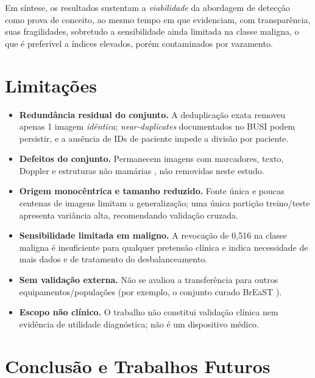\documentclass[11pt,a4paper]{article}
\begin{document}
Em síntese, os resultados sustentam a \emph{viabilidade} da abordagem de detecção
como prova de conceito, ao mesmo tempo em que evidenciam, com transparência, suas
fragilidades, sobretudo a sensibilidade ainda limitada na classe maligna, o
que é preferível a índices elevados, porém contaminados por vazamento.

\section{Limitações}\label{sec:limitacoes}

\begin{itemize}[topsep=2pt]
  \item \textbf{Redundância residual do conjunto.} A deduplicação exata removeu
  apenas 1 imagem \emph{idêntica}; \emph{near-duplicates} documentados no BUSI
  podem persistir, e a ausência de IDs de paciente impede a divisão por paciente.
  \item \textbf{Defeitos do conjunto.} Permanecem imagens com marcadores, texto,
  Doppler e estruturas não mamárias \citep{pawlowska2023,pawlowska2024}, não
  removidas neste estudo.
  \item \textbf{Origem monocêntrica e tamanho reduzido.} Fonte única e poucas
  centenas de imagens limitam a generalização; uma única partição
  treino/teste apresenta variância alta, recomendando validação cruzada.
  \item \textbf{Sensibilidade limitada em maligno.} A revocação de 0,516 na classe
  maligna é insuficiente para qualquer pretensão clínica e indica necessidade de
  mais dados e de tratamento do desbalanceamento.
  \item \textbf{Sem validação externa.} Não se avaliou a transferência para
  outros equipamentos/populações (por exemplo, o conjunto curado BrEaST
  \citep{pawlowska2024}).
  \item \textbf{Escopo não clínico.} O trabalho não constitui validação clínica
  nem evidência de utilidade diagnóstica; não é um dispositivo médico.
\end{itemize}

\section{Conclusão e Trabalhos Futuros}\label{sec:conclusao}
\end{document}

